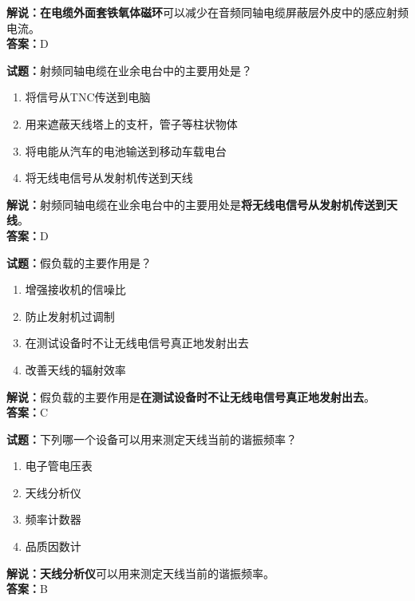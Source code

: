 \documentclass{ctexbook}
\begin{document}
\noindent\textbf{解说：}\textbf{在电缆外面套铁氧体磁环}可以减少在音频同轴电缆屏蔽层外皮中的感应射频电流。\\\noindent\textbf{答案：}D


\bigskip


\noindent\textbf{试题：}射频同轴电缆在业余电台中的主要用处是？

\begin{enumerate}[leftmargin=3em]
	\item 将信号从TNC传送到电脑
	\item 用来遮蔽天线塔上的支杆，管子等柱状物体
	\item 将电能从汽车的电池输送到移动车载电台
	\item 将无线电信号从发射机传送到天线
\end{enumerate}

\noindent\textbf{解说：}射频同轴电缆在业余电台中的主要用处是\textbf{将无线电信号从发射机传送到天线}。\\\noindent\textbf{答案：}D


\bigskip


\noindent\textbf{试题：}假负载的主要作用是？

\begin{enumerate}[leftmargin=3em]
	\item 增强接收机的信噪比
	\item 防止发射机过调制
	\item 在测试设备时不让无线电信号真正地发射出去
	\item 改善天线的辐射效率
\end{enumerate}

\noindent\textbf{解说：}假负载的主要作用是\textbf{在测试设备时不让无线电信号真正地发射出去}。\\\noindent\textbf{答案：}C


\bigskip


\noindent\textbf{试题：}下列哪一个设备可以用来测定天线当前的谐振频率？

\begin{enumerate}[leftmargin=3em]
	\item 电子管电压表
	\item 天线分析仪
	\item 频率计数器
	\item 品质因数计
\end{enumerate}

\noindent\textbf{解说：}\textbf{天线分析仪}可以用来测定天线当前的谐振频率。\\\noindent\textbf{答案：}B
\end{document}
